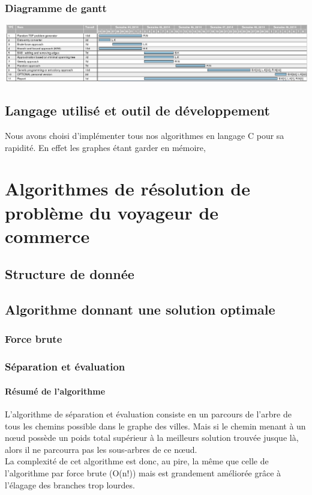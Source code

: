 \documentclass[10pt,a4paper]{report}
\begin{document}
		\subsubsection{Diagramme de gantt}
		
			\includegraphics[scale=0.37]{./Ressource/planning_AA.png}
		
	
	\subsection{Langage utilisé et outil de développement}
	\begin{flushleft}
	Nous avons choisi d'implémenter tous nos algorithmes en langage C  pour sa rapidité. En effet les graphes étant garder en mémoire, 
	\end{flushleft}
	
\section{Algorithmes de résolution de problème du voyageur de commerce}

	\subsection{Structure de donnée}
	
	\subsection{Algorithme donnant une solution optimale}
		\subsubsection{Force brute}
		
		\subsubsection{Séparation et évaluation}
		
		\paragraph{Résumé de l'algorithme\\}
		L'algorithme de séparation et évaluation consiste en un parcours de l'arbre de tous les chemins possible dans le graphe des villes. Mais si le chemin menant à un nœud possède un poids total supérieur à la meilleurs solution trouvée jusque là, alors il ne parcourra pas les sous-arbres de ce nœud.\\
		La complexité de cet algorithme est donc, au pire, la même que celle de l'algorithme par force brute (O(n!)) mais est grandement améliorée grâce à l'élagage des branches trop lourdes.\\
		
\end{document}
